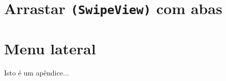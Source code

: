 \documentclass[a4paper,12pt,brazil,doubleside]{book}
\begin{document}
\begin{singlespace}
	
	
	
	
	
	
\section{Arrastar \texttt{(SwipeView)} com abas}
\section{Menu lateral}


\end{singlespace}




\singlespace
{}
\cleardoublepage
\thispagestyle{empty}
\doublespace


\appendix
{} %

Isto é um apêndice...

\end{document}
